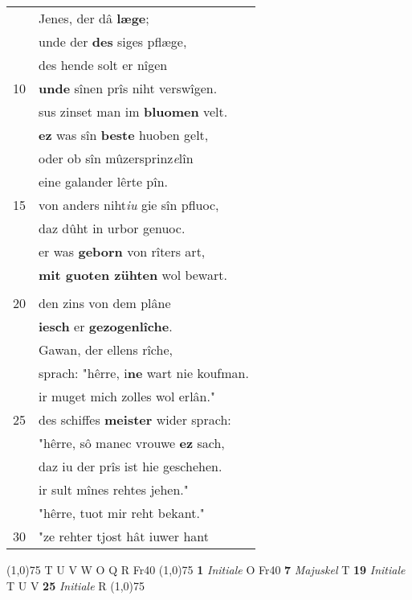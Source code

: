 \documentclass[8pt,a4paper,notitlepage]{article}
\begin{document}
\begin{table}[ht]
\begin{minipage}[t]{0.5\linewidth}
\begin{tabular}{rl}
 & Jenes, der dâ \textbf{læge};\\ 
 & unde der \textbf{des} siges pflæge,\\ 
 & des hende solt er nîgen\\ 
10 & \textbf{unde} sînen prîs niht verswîgen.\\ 
 & sus zinset man im \textbf{bluomen} velt.\\ 
 & \textbf{ez} was sîn \textbf{beste} huoben gelt,\\ 
 & oder ob sîn mûzersprinz\textit{e}lîn\\ 
 & eine galander lêrte pîn.\\ 
15 & von anders niht\textit{iu} gie sîn pfluoc,\\ 
 & daz dûht in urbor genuoc.\\ 
 & er was \textbf{geborn} von rîters art,\\ 
 & \textbf{mit guoten zühten} wol bewart.\\ 
 & \textbf{\textit{\begin{large}E\end{large}}r gie} zuo Gawane.\\ 
20 & den zins von dem plâne\\ 
 & \textbf{iesch} er \textbf{gezogenlîche}.\\ 
 & Gawan, der ellens rîche,\\ 
 & sprach: "hêrre, i\textbf{ne} wart nie koufman.\\ 
 & ir muget mich zolles wol erlân."\\ 
25 & des schiffes \textbf{meister} wider sprach:\\ 
 & "hêrre, sô manec vrouwe \textbf{ez} sach,\\ 
 & daz iu der prîs ist hie geschehen.\\ 
 & ir sult mînes rehtes jehen."\\ 
 & "hêrre, tuot mir reht bekant."\\ 
30 & "ze rehter tjost hât iuwer hant\\ 
\end{tabular}
\scriptsize
\line(1,0){75} \newline
T U V W O Q R Fr40 \newline
\line(1,0){75} \newline
\textbf{1} \textit{Initiale} O Fr40  \textbf{7} \textit{Majuskel} T  \textbf{19} \textit{Initiale} T U V  \textbf{25} \textit{Initiale} R  \newline
\line(1,0){75} \newline

\end{minipage}
\end{table}
\end{document}
